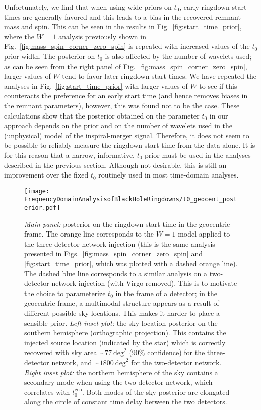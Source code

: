 Unfortunately, we find that when using wide priors on $t_0$, early ringdown start times are generally favored and this leads to a bias in the recovered remnant mass and spin.
This can be seen in the results in Fig.~\ref{fig:start_time_prior}, where the $W=1$ analysis previously shown in Fig.~\ref{fig:mass_spin_corner_zero_spin} is repeated with increased values of the $t_0$ prior width.
The posterior on $t_0$ is also affected by the number of wavelets used;
as can be seen from the right panel of Fig.~\ref{fig:mass_spin_corner_zero_spin}, larger values of $W$ tend to favor later ringdown start times. 
We have repeated the analyses in Fig.~\ref{fig:start_time_prior} with larger values of $W$ to see if this counteracts the preference for an early start time (and hence removes biases in the remnant parameters), however, this was found not to be the case.
These calculations show that the posterior obtained on the parameter $t_0$ in our approach depends on the prior and on the number of wavelets used in the (unphysical) model of the inspiral-merger signal.
Therefore, it does not seem to be possible to reliably measure the ringdown start time from the data alone.
It is for this reason that a narrow, informative, $t_0$ prior must be used in the analyses described in the previous section.
Although not desirable, this is still an improvement over the fixed $t_0$ routinely used in most time-domain analyses.

\begin{figure*}
	\centering
	\texttt{[image: FrequencyDomainAnalysisofBlackHoleRingdowns/t0\_geocent\_posterior.pdf]}
	\caption[Posteriors on the ringdown start time]{ 
		\emph{Main panel:} posterior on the ringdown start time in the geocentric frame. The orange line corresponds to the $W=1$ model applied to the three-detector network injection (this is the same analysis presented in Figs.~\ref{fig:mass_spin_corner_zero_spin} and \ref{fig:start_time_prior}, which was plotted with a dashed orange line). 
		The dashed blue line corresponds to a similar analysis on a two-detector network injection (with Virgo removed). This is to motivate the choice to parameterize $t_0$ in the frame of a detector; in the geocentric frame, a multimodal structure appears as a result of different possible sky locations. This makes it harder to place a sensible prior.
		\emph{Left inset plot:} the sky location posterior on the southern hemisphere (orthographic projection). This contains the injected source location (indicated by the star) which is correctly recovered with sky area $\sim 77\ \mathrm{deg}^2$ (90\% confidence) for the three-detector network, and $\sim 1800\ \mathrm{deg}^2$ for the two-detector network.
		\emph{Right inset plot:} the northern hemisphere of the sky contains a secondary mode when using the two-detector network, which correlates with $t_0^\mathrm{geo}$. Both modes of the sky posterior are elongated along the circle of constant time delay between the two detectors.
	}
	\label{fig:t0_geocent_posterior}
\end{figure*}

